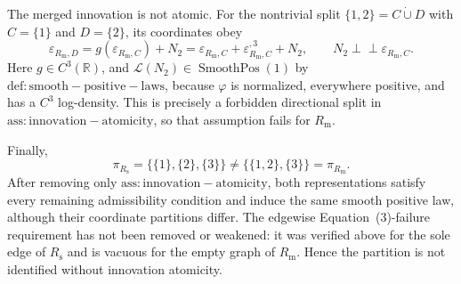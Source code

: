The merged innovation is not atomic.  For the nontrivial split \(\{1,2\}=C\mathbin{\dot\cup}D\) with \(C=\{1\}\) and \(D=\{2\}\), its coordinates obey
\[
 \varepsilon_{R_{\mathrm{m}},D}
   =g(\varepsilon_{R_{\mathrm{m}},C})+N_2
   =\varepsilon_{R_{\mathrm{m}},C}
      +\varepsilon_{R_{\mathrm{m}},C}^{,3}+N_2,
 \qquad N_2\perp\!\!\!\perp\varepsilon_{R_{\mathrm{m}},C}.
\]
Here \(g\in C^3(\mathbb R)\), and \(\mathcal L(N_2)\in\operatorname{SmoothPos}(1)\) by \(\mathrm{def:smooth-positive-laws}\), because \(\varphi\) is normalized, everywhere positive, and has a \(C^3\) log-density.  This is precisely a forbidden directional split in \(\mathrm{ass:innovation-atomicity}\), so that assumption fails for \(R_{\mathrm{m}}\).

Finally,
\[
 \pi_{R_{\mathrm{s}}}=\bigl\{\{1\},\{2\},\{3\}\bigr\}
 \ne
 \bigl\{\{1,2\},\{3\}\bigr\}=\pi_{R_{\mathrm{m}}}.
\]
After removing only \(\mathrm{ass:innovation-atomicity}\), both representations satisfy every remaining admissibility condition and induce the same smooth positive law, although their coordinate partitions differ.  The edgewise Equation~(3)-failure requirement has not been removed or weakened: it was verified above for the sole edge of \(R_{\mathrm{s}}\) and is vacuous for the empty graph of \(R_{\mathrm{m}}\).  Hence the partition is not identified without innovation atomicity.